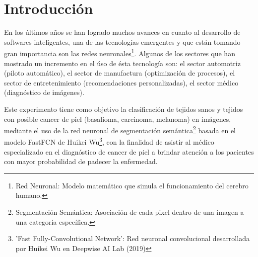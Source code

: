 \chapter{Introducción}

En los últimos años se han logrado muchos avances en cuanto al desarrollo de softwares inteligentes, una de las tecnologías emergentes y que están tomando gran importancia son las redes neuronales\footnote {Red Neuronal: Modelo matemático que simula el funcionamiento del cerebro humano. }. Algunos de los sectores que han mostrado un incremento en el úso de ésta tecnología son: el sector automotriz (piloto automático), el sector de manufactura (optimización de procesos), el sector de entretenimiento (recomendaciones personalizadas), el sector médico (diagnóstico de imágenes). 

Este experimento tiene como objetivo la clasificación de tejidos sanos y tejidos con posible cancer de piel (basalioma, carcinoma, melanoma) en imágenes, mediante el uso de la red neuronal de segmentación semántica\footnote {Segmentación Semántica: Asociación de cada pixel dentro de una imagen a una categoría específica.} basada en el modelo FastFCN de Huikei Wu\footnote {'Fast Fully-Convolutional Network': Red neuronal convolucional desarrollada por Huikei Wu en Deepwise AI Lab (2019)}, con la finalidad de asistír al médico especializado en el diagnóstico de cancer de piel a brindar atención a los pacientes con mayor probabilidad de padecer la enfermedad.


